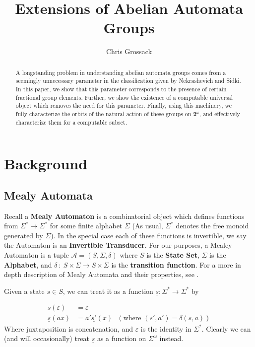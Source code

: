 \documentclass[12pt]{article}
\title{Extensions of Abelian Automata Groups}
\author{Chris Grossack}
\newcommand{\A}{\mathcal{A}}
\newcommand{\2}{\textbf{2}}
\begin{document}
\maketitle

\begin{abstract}
  A longstanding problem in understanding abelian automata groups
  comes from a seemingly unnecessary parameter in the classification
  given by Nekrashevich and Sidki. In this paper, we show that
  this parameter corresponds to the presence of certain fractional group
  elements. Further, we show the existence of a computable universal object 
  which removes the need for this parameter. Finally, using this machinery, 
  we fully characterize the orbits of the natural action of these groups on 
  $\2^\omega$, and effectively characterize them for a computable subset.
\end{abstract}

\section{Background}
\subsection{Mealy Automata}
Recall a \textbf{Mealy Automaton} is a combinatorial object which defines
functions from $\Sigma^* \to \Sigma^*$ for some finite alphabet $\Sigma$
(As usual, $\Sigma^*$ denotes the free monoid generated by $\Sigma$).
In the special case each of these functions is invertible, we say the
Automaton is an \textbf{Invertible Transducer}. For our purposes, 
a Mealey Automaton is a tuple 
$\A = (S, \Sigma, \delta)$
where $S$ is the \textbf{State Set}, $\Sigma$ is the \textbf{Alphabet},
and $\delta~:~S \times \Sigma \to S \times \Sigma$ is the
\textbf{transition function}. For a more in depth description of 
Mealy Automata and their properties, 
see \cite{Holcombe, Sakarovitch09:automata_theory}.

Given a state $s \in S$, we can treat it as a function 
$\underline{s} : \Sigma^* \to \Sigma^*$ by 

\begin{align*}
  \underline{s}(\varepsilon) &= \varepsilon\\
  \underline{s}(ax)       &= a' \underline{s'}(x) 
  ~~~(\text{where } (s', a') = \delta(s,a))
\end{align*}
Where juxtaposition is concatenation, and $\varepsilon$ is
the identity in $\Sigma^*$. Clearly we can (and will occasionally) treat 
$\underline{s}$ as a function on $\Sigma^\omega$ instead.
\end{document}
